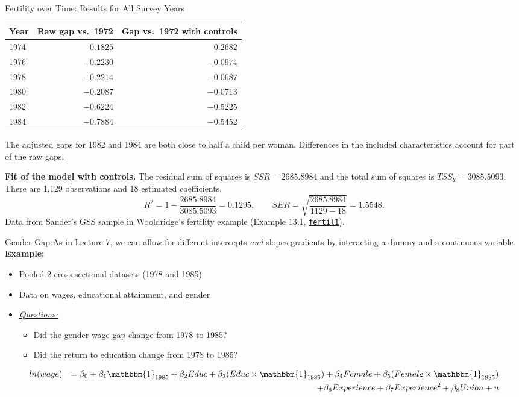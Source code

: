 \documentclass[notes,10pt, aspectratio=169]{beamer}
\begin{document}
\begin{frame}{Fertility over Time: Results for All Survey Years}
\small
\begin{center}
\begin{tabular}{lrr}
\toprule
Year & Raw gap vs.\ 1972 & Gap vs.\ 1972 with controls\\
\midrule
1974 & $0.1825$ & $0.2682$\\
1976 & $-0.2230$ & $-0.0974$\\
1978 & $-0.2214$ & $-0.0687$\\
1980 & $-0.2087$ & $-0.0713$\\
1982 & $-0.6224$ & $-0.5225$\\
1984 & $-0.7884$ & $-0.5452$\\
\bottomrule
\end{tabular}
\end{center}
The adjusted gaps for 1982 and 1984 are both close to half a child per woman. Differences in the included characteristics account for part of the raw gaps.
\medskip

\textbf{Fit of the model with controls.} The residual sum of squares is $SSR=2685.8984$ and the total sum of squares is $TSS_Y=3085.5093$. There are 1,129 observations and 18 estimated coefficients.
\[
R^2=1-\frac{2685.8984}{3085.5093}=0.1295,
\qquad
SER=\sqrt{\frac{2685.8984}{1129-18}}=1.5548.
\]
{\footnotesize Data from Sander's GSS sample in Wooldridge's fertility example (Example 13.1, \href{https://justinmshea.github.io/wooldridge/reference/fertil1.html}{\texttt{fertil1}}).}
\end{frame}


\begin{frame}{Gender Gap}
As in Lecture 7, we can allow for different intercepts \textit{and} slopes gradients by interacting a dummy and a continuous variable\\[1em]

\textbf{Example:}
\begin{itemize}
    \item Pooled 2 cross-sectional datasets (1978 and 1985)
    \item Data on wages, educational attainment, and gender
    \item \underline{\textit{Questions:}}
    \begin{itemize}
        \item Did the gender wage gap change from 1978 to 1985?
        \item Did the return to education change from 1978 to 1985?
\end{itemize}
\end{itemize}
\begin{eqnarray*}
    &ln(wage) &= \beta_0 + \beta_1 \mathbbm{1}_{1985} + \beta_2 Educ + \beta_3 (Educ \times \mathbbm{1}_{1985} ) + \beta_4 Female + \beta_5 (Female \times \mathbbm{1}_{1985} ) \\
    &{} &+ \beta_6 Experience  + \beta_7 {Experience}^2 + \beta_8 Union + u
\end{eqnarray*}
\end{frame}
\end{document}
